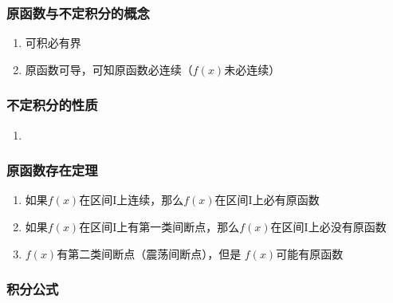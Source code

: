 \subsubsection{原函数与不定积分的概念}

\begin{enumerate}
    \item 可积必有界
    \item 原函数可导，可知原函数必连续（$f(x)$未必连续）
\end{enumerate}

\subsubsection{不定积分的性质}

\begin{enumerate}
    \item 
\end{enumerate}

\subsubsection{原函数存在定理}

\begin{enumerate}
    \item 如果$f(x)$在区间I上连续，那么$f(x)$在区间I上必有原函数
    \item 如果$f(x)$在区间I上有第一类间断点，那么$f(x)$在区间I上必没有原函数
    \item $f(x)$有第二类间断点（震荡间断点），但是 $f(x)$可能有原函数
\end{enumerate}

\subsubsection{积分公式}

